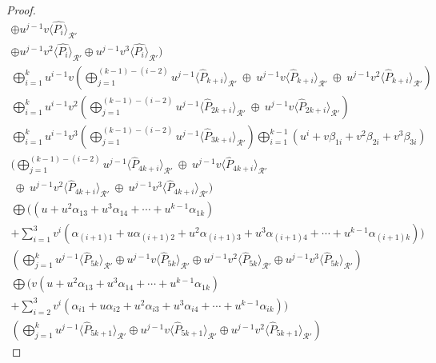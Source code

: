 \documentclass{amsart}
\theoremstyle{definition}
\theoremstyle{remark}
\numberwithin{equation}{section}
\begin{document}
\begin{proof}
\begin{gather*}
      \oplus  u^{j-1}v\langle \hat{P_i} \rangle_{\mathcal{R}'}
     \\ \oplus u^{j-1}v^2\langle \hat{P_i} \rangle_{\mathcal{R}'}
      \oplus  u^{j-1}v^3\langle \hat{P_i} \rangle_{\mathcal{R}'})
      \\ \bigoplus_{i=1}^{k} u^{i-1}v\left( \bigoplus_{j=1}^{(k-1)-(i-2)}  u^{j-1}\langle \hat{P}_{k+i} \rangle_{\mathcal{R}'}
      ~\oplus~  u^{j-1}v\langle \hat{P}_{k+i} \rangle_{\mathcal{R}'}
      ~\oplus~  u^{j-1}v^2\langle \hat{P}_{k+i} \rangle_{\mathcal{R}'}\right)
      \\ \bigoplus_{i=1}^{k} u^{i-1}v^2\left( \bigoplus_{j=1}^{(k-1)-(i-2)}  u^{j-1}\langle \hat{P}_{2k+i} \rangle_{\mathcal{R}'}
      ~\oplus~  u^{j-1}v\langle \hat{P}_{2k+i} \rangle_{\mathcal{R}'}\right)
      \\ \bigoplus_{i=1}^{k} u^{i-1}v^3\left( \bigoplus_{j=1}^{(k-1)-(i-2)}  u^{j-1}\langle \hat{P}_{3k+i} \rangle_{\mathcal{R}'}\right)
       \bigoplus_{i=1}^{k-1}  (u^i+ v\beta_{1i} + v^2\beta_{2i} + v^3\beta_{3i}) \\
      ( \bigoplus_{j=1}^{(k-1)-(i-2)}  u^{j-1}\langle \hat{P}_{4k+i} \rangle_{\mathcal{R}'}
      ~\oplus~  u^{j-1}v\langle \hat{P}_{4k+i} \rangle_{\mathcal{R}'}
      \\~\oplus~  u^{j-1}v^2\langle \hat{P}_{4k+i} \rangle_{\mathcal{R}'}
      ~\oplus~  u^{j-1}v^3\langle \hat{P}_{4k+i} \rangle_{\mathcal{R}'})
      \\  \bigoplus  ((u + u^2\alpha_{13} + u^3\alpha_{14} + \cdots + u^{k-1}\alpha_{1k})
     \\ + \sum_{i=1}^{3} v^i( \alpha_{(i+1)1} + u\alpha_{(i+1)2} + u^2\alpha_{(i+1)3} + u^3\alpha_{(i+1)4} + \cdots + u^{k-1}\alpha_{(i+1)k} )) \\ \left( \bigoplus_{j=1}^{k}  u^{j-1}\langle \hat{P}_{5k} \rangle_{\mathcal{R}'}
      \oplus  u^{j-1}v\langle \hat{P}_{5k} \rangle_{\mathcal{R}'}
      \oplus u^{j-1}v^2\langle \hat{P}_{5k} \rangle_{\mathcal{R}'}
      \oplus  u^{j-1}v^3\langle \hat{P}_{5k} \rangle_{\mathcal{R}'}\right)
     \\  \bigoplus   (v(u + u^2\alpha_{13} + u^3\alpha_{14} + \cdots + u^{k-1}\alpha_{1k})
     \\  + \sum_{i=2}^{3} v^i( \alpha_{i1} + u\alpha_{i2} + u^2\alpha_{i3} + u^3\alpha_{i4} + \cdots + u^{k-1}\alpha_{ik} )) \\
     \left( \bigoplus_{j=1}^{k}  u^{j-1}\langle \hat{P}_{5k+1} \rangle_{\mathcal{R}'}
      \oplus  u^{j-1}v\langle \hat{P}_{5k+1} \rangle_{\mathcal{R}'}
      \oplus  u^{j-1}v^2\langle \hat{P}_{5k+1} \rangle_{\mathcal{R}'}\right)

\end{gather*}
\end{proof}
\end{document}
